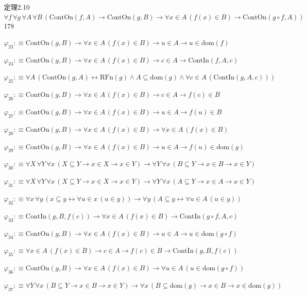 \begin{fullproof}{定理2.10}{$\forall f\,\forall g\,\forall A\,\forall B\,(\mathrm{ContOn}(f,A) \to \mathrm{ContOn}(g,B) \to \forall x \in A\,(f(x) \in B) \to \mathrm{ContOn}(g \circ f,A))$}{178}
\begin{abbrevlist}
\item $\varphi_{23} :\equiv \mathrm{ContOn}(g,B) \to \forall x \in A\,(f(x) \in B) \to u \in A \to u \in \mathrm{dom}(f)$
\item $\varphi_{24} :\equiv \mathrm{ContOn}(g,B) \to \forall x \in A\,(f(x) \in B) \to c \in A \to \mathrm{ContIn}(f,A,c)$
\item $\varphi_{25} :\equiv \forall A\,(\mathrm{ContOn}(g,A) \leftrightarrow \mathrm{RFn}(g) \land A \subseteq \mathrm{dom}(g) \land \forall c \in A\,(\mathrm{ContIn}(g,A,c)))$
\item $\varphi_{26} :\equiv \mathrm{ContOn}(g,B) \to \forall x \in A\,(f(x) \in B) \to c \in A \to f(c) \in B$
\item $\varphi_{27} :\equiv \mathrm{ContOn}(g,B) \to \forall x \in A\,(f(x) \in B) \to u \in A \to f(u) \in B$
\item $\varphi_{28} :\equiv \mathrm{ContOn}(g,B) \to \forall x \in A\,(f(x) \in B) \to \forall x \in A\,(f(x) \in B)$
\item $\varphi_{29} :\equiv \mathrm{ContOn}(g,B) \to \forall x \in A\,(f(x) \in B) \to u \in A \to f(u) \in \mathrm{dom}(g)$
\item $\varphi_{30} :\equiv \forall X\,\forall Y\,\forall x\,(X \subseteq Y \to x \in X \to x \in Y) \to \forall Y\,\forall x\,(B \subseteq Y \to x \in B \to x \in Y)$
\item $\varphi_{31} :\equiv \forall X\,\forall Y\,\forall x\,(X \subseteq Y \to x \in X \to x \in Y) \to \forall Y\,\forall x\,(A \subseteq Y \to x \in A \to x \in Y)$
\item $\varphi_{32} :\equiv \forall x\,\forall y\,(x \subseteq y \leftrightarrow \forall u \in x\,(u \in y)) \to \forall y\,(A \subseteq y \leftrightarrow \forall u \in A\,(u \in y))$
\item $\varphi_{33} :\equiv \mathrm{ContIn}(g,B,f(c)) \to \forall x \in A\,(f(x) \in B) \to \mathrm{ContIn}(g \circ f,A,c)$
\item $\varphi_{34} :\equiv \mathrm{ContOn}(g,B) \to \forall x \in A\,(f(x) \in B) \to u \in A \to u \in \mathrm{dom}(g \circ f)$
\item $\varphi_{35} :\equiv \forall x \in A\,(f(x) \in B) \to c \in A \to f(c) \in B \to \mathrm{ContIn}(g,B,f(c))$
\item $\varphi_{36} :\equiv \mathrm{ContOn}(g,B) \to \forall x \in A\,(f(x) \in B) \to \forall u \in A\,(u \in \mathrm{dom}(g \circ f))$
\item $\varphi_{37} :\equiv \forall Y\,\forall x\,(B \subseteq Y \to x \in B \to x \in Y) \to \forall x\,(B \subseteq \mathrm{dom}(g) \to x \in B \to x \in \mathrm{dom}(g))$

\end{abbrevlist}
\end{fullproof}

